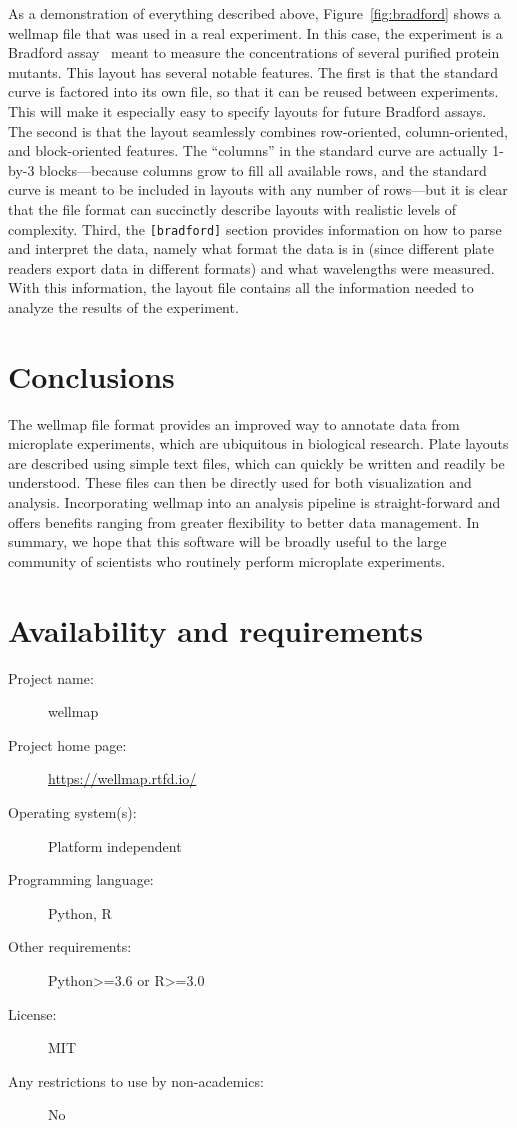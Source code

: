 \documentclass{bmcart}
\begin{document}
As a demonstration of everything described above, Figure~\ref{fig:bradford}
shows a wellmap file that was used in a real experiment. In this case,
the experiment is a Bradford assay~\cite{bradford1976} meant to
measure the concentrations of several purified protein mutants. This
layout has several notable features. The first is that the standard
curve is factored into its own file, so that it can be reused between
experiments. This will make it especially easy to specify layouts
for future Bradford assays. The second is that the layout seamlessly
combines row-oriented, column-oriented, and block-oriented features.
The ``columns'' in the standard curve are actually 1-by-3 blocks---because
columns grow to fill all available rows, and the standard curve is
meant to be included in layouts with any number of rows---but it
is clear that the file format can succinctly describe layouts with
realistic levels of complexity. Third, the \texttt{{[}bradford{]}}
section provides information on how to parse and interpret the data,
namely what format the data is in (since different plate readers export
data in different formats) and what wavelengths were measured. With
this information, the layout file contains all the information needed
to analyze the results of the experiment.

\section*{Conclusions}

The wellmap file format provides an improved way to annotate data
from microplate experiments, which are ubiquitous in biological research.
Plate layouts are described using simple text files, which can quickly
be written and readily be understood. These files can then be directly
used for both visualization and analysis. Incorporating wellmap into
an analysis pipeline is straight-forward and offers benefits ranging
from greater flexibility to better data management. In summary, we
hope that this software will be broadly useful to the large community
of scientists who routinely perform microplate experiments.

\section*{Availability and requirements}
\begin{description}
\item [Project name:] wellmap
\item [Project home page:] \url{https://wellmap.rtfd.io/}
\item [Operating system(s):] Platform independent
\item [Programming language:] Python, R
\item [Other requirements:] Python\textgreater=3.6 or R\textgreater=3.0
\item [License:] MIT
\item [Any restrictions to use by non-academics:] No
\end{description}
\end{document}
